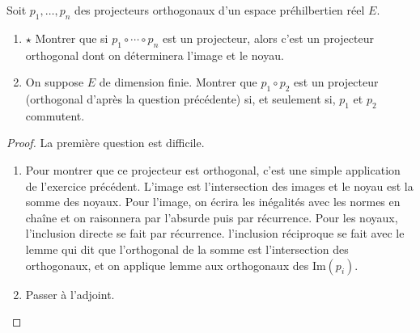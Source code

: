 \documentclass[french,a4paper]{article}
\newcommand{\im}{\text{Im}}
\theoremstyle{plain}
\theoremstyle{definition}
\theoremstyle{remark}
\begin{document}
\begin{ex}{}
	Soit $p_1,\ldots,p_n$ des projecteurs orthogonaux d'un espace préhilbertien réel $E$.
	\begin{enumerate}
		\item $\star$ Montrer que si $p_1\circ\cdots\circ p_n$ est un projecteur, alors c'est un projecteur orthogonal dont on déterminera l'image et le noyau.
		\item On suppose $E$ de dimension finie. Montrer que $p_1\circ p_2$ est un projecteur (orthogonal d'après la question précédente) si, et seulement si, $p_1$ et $p_2$ commutent.
	\end{enumerate}
\end{ex}
\begin{proof}
	La première question est difficile.
	\begin{enumerate}
		\item Pour montrer que ce projecteur est orthogonal, c'est une simple application de l'exercice précédent. L'image est l'intersection des images et le noyau est la somme des noyaux. Pour l'image, on écrira les inégalités avec les normes en chaîne et on raisonnera par l'absurde puis par récurrence. Pour les noyaux, l'inclusion directe se fait par récurrence. l'inclusion réciproque se fait avec le lemme qui dit que l'orthogonal de la somme est l'intersection des orthogonaux, et on applique lemme aux orthogonaux des $\im(p_i)$.
		\item Passer à l'adjoint.
	\end{enumerate}
\end{proof}
\end{document}

